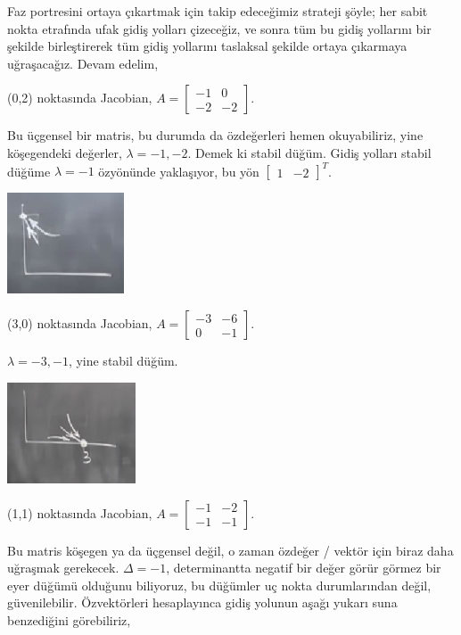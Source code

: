 \documentclass[12pt,fleqn]{article}\usepackage{../../common}
\begin{document}
Faz portresini ortaya çıkartmak için takip edeceğimiz strateji şöyle; her sabit
nokta etrafında ufak gidiş yolları çizeceğiz, ve sonra tüm bu gidiş yollarını
bir şekilde birleştirerek tüm gidiş yollarını taslaksal şekilde ortaya çıkarmaya
uğraşacağız.  Devam edelim,

(0,2) noktasında Jacobian, $A = \left[\begin{array}{rr} -1 & 0 \\ -2 & -2\end{array}\right]$.

Bu üçgensel bir matris, bu durumda da özdeğerleri hemen okuyabiliriz, yine
köşegendeki değerler, $\lambda = -1,-2$. Demek ki stabil düğüm. Gidiş yolları
stabil düğüme $\lambda = -1$ özyönünde yaklaşıyor, bu yön
$\left[\begin{array}{cc} 1 & -2 \end{array}\right]^T$. 

\includegraphics[height=3cm]{06_08.png}

(3,0) noktasında Jacobian, $A = \left[\begin{array}{rr} -3 & -6 \\ 0 & -1\end{array}\right]$.

$\lambda = -3,-1$, yine stabil düğüm.

\includegraphics[height=3cm]{06_09.png}

(1,1) noktasında Jacobian, $A = \left[\begin{array}{rr} -1 & -2 \\ -1 & -1\end{array}\right]$.

Bu matris köşegen ya da üçgensel değil, o zaman özdeğer / vektör için biraz daha
uğraşmak gerekecek. $\Delta = -1$, determinantta negatif bir değer görür görmez
bir eyer düğümü olduğunu biliyoruz, bu düğümler uç nokta durumlarından değil,
güvenilebilir. Özvektörleri hesaplayınca gidiş yolunun aşağı yukarı suna
benzediğini görebiliriz, 
\end{document}
